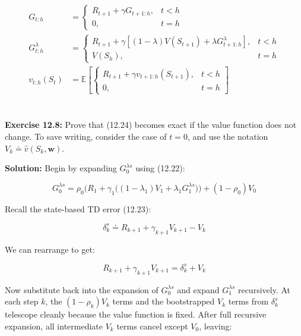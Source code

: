 \documentclass{article}
\begin{document}
\begin{align*}
G_{t:h} &=
\begin{cases}
R_{t+1} + \gamma G_{t+1:h}, & t < h \\
0, & t = h
\end{cases} \\[1em]
G_{t:h}^\lambda &=
\begin{cases}
R_{t+1} + \gamma \left[(1-\lambda)V(S_{t+1}) + \lambda G_{t+1:h}^\lambda\right], & t < h \\
V(S_h), & t = h
\end{cases} \\[1em]
v_{t:h}(S_t) &=
\mathbb{E}\left[
\begin{cases}
R_{t+1} + \gamma v_{t+1:h}(S_{t+1}), & t < h \\
0, & t = h
\end{cases}
\right]
\end{align*}
\\\\
\textbf{Exercise 12.8:} Prove that (12.24) becomes exact if the value function does not
change. To save writing, consider the case of $t = 0$, and use the notation
$V_k \doteq \hat{v}(S_k, \mathbf{w})$.

\bigskip

\textbf{Solution:} Begin by expanding $G_0^{\lambda s}$ using (12.22):

\begin{equation}
G_0^{\lambda s} = \rho_0\Big(R_1 + \gamma_1\big((1-\lambda_1)V_1
+ \lambda_1 G_1^{\lambda s}\big)\Big) + (1-\rho_0)V_0
\end{equation}

Recall the state-based TD error (12.23):

\begin{equation}
\delta_k^s \doteq R_{k+1} + \gamma_{k+1}V_{k+1} - V_k
\end{equation}

We can rearrange to get:

\begin{equation}
R_{k+1} + \gamma_{k+1}V_{k+1} = \delta_k^s + V_k
\end{equation}

Now substitute back into the expansion of $G_0^{\lambda s}$ and expand $G_1^{\lambda s}$
recursively. At each step $k$, the $(1 - \rho_k)V_k$ terms and the bootstrapped $V_k$
terms from $\delta_k^s$ telescope cleanly because the value function is fixed. After full
recursive expansion, all intermediate $V_k$ terms cancel except $V_0$, leaving:
\end{document}
